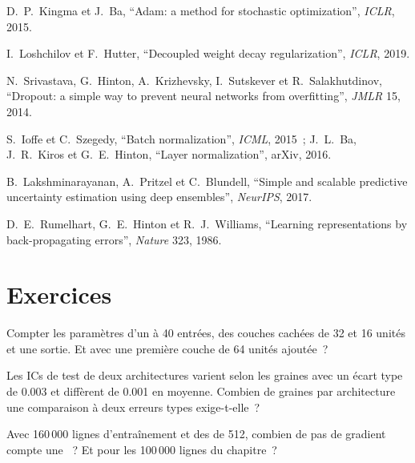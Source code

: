 \begin{omsources}
\item D.~P.~Kingma et J.~Ba, ``Adam: a method for stochastic optimization'', \emph{ICLR}, 2015.
\item I.~Loshchilov et F.~Hutter, ``Decoupled weight decay regularization'', \emph{ICLR}, 2019.
\item N.~Srivastava, G.~Hinton, A.~Krizhevsky, I.~Sutskever et R.~Salakhutdinov, ``Dropout: a simple way to prevent
neural networks from overfitting'', \emph{JMLR} 15, 2014.
\item S.~Ioffe et C.~Szegedy, ``Batch normalization'', \emph{ICML}, 2015~; J.~L.~Ba, J.~R.~Kiros et G.~E.~Hinton,
``Layer normalization'', arXiv, 2016.
\item B.~Lakshminarayanan, A.~Pritzel et C.~Blundell, ``Simple and scalable predictive uncertainty estimation using deep
ensembles'', \emph{NeurIPS}, 2017.
\item D.~E.~Rumelhart, G.~E.~Hinton et R.~J.~Williams, ``Learning representations by back-propagating errors'',
\emph{Nature} 323, 1986.
\end{omsources}

\section{Exercices}

\begin{exercise}[$\star$]\label{exo:ml:neural-networks-for-noisy-tabular-data:1}
Compter les paramètres d'un  à 40 entrées, des couches cachées de 32 et 16 unités et une sortie. Et avec une première couche
de 64 unités ajoutée~?
\end{exercise}

\begin{exercise}[$\star$]\label{exo:ml:neural-networks-for-noisy-tabular-data:2}
Les ICs de test de deux architectures varient selon les graines avec un écart type de 0.003 et diffèrent de 0.001 en moyenne. Combien
de graines par architecture une comparaison à deux erreurs types exige-t-elle~?
\end{exercise}

\begin{exercise}[$\star$]\label{exo:ml:neural-networks-for-noisy-tabular-data:3}
Avec 160\,000 lignes d'entraînement et des  de 512, combien de pas de gradient compte une ~? Et pour les
100\,000 lignes du chapitre~?
\end{exercise}

